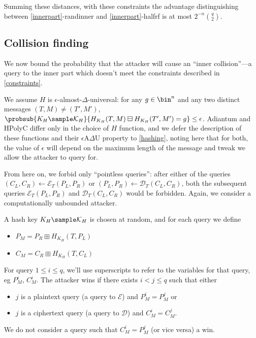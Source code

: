 \documentclass[journal=tosc,preprint,floatrow,submission]{iacrtrans}
\newcommand*{\xprm}[2]{\textsf{\ref*{#1}-#2}}
\newcommand*{\calE}{\mathcal{E}}
\newcommand*{\calD}{\mathcal{D}}
\begin{document}
Summing these distances, with these constraints the advantage distinguishing between
\xprm{innerpart}{randinner} and \xprm{innerpart}{halfrf} is at most
$2^{-n}\binom{q}{2}$.

\subsection{Collision finding}\label{collision}
We now bound the probability that the attacker will cause an
``inner collision''---a query to the inner part which doesn't meet the constraints described
in \autoref{constraints}.

We assume $H$ is $\epsilon$-almost-$\Delta$-universal:
for any $g \in \bin^n$ and
any two distinct messages $(T, M) \neq (T', M')$,
$\probsub{K_H \sample \mathcal{K}_H}{H_{K_H}(T, M) \boxminus H_{K_H}(T', M') = g} \leq \epsilon$.
Adiantum and HPolyC differ only in the choice of $H$ function, and we defer the
description of these functions and their $\epsilon$A$\Delta$U property to \autoref{hashing},
noting here that for both, the value of $\epsilon$ will depend
on the maximum length of the message and tweak we allow the attacker to query for.

From here on, we forbid only ``pointless queries'': after either of the queries
$(C_L, C_R) \leftarrow \calE_T(P_L, P_R)$ or $(P_L, P_R) \leftarrow \calD_T(C_L, C_R)$,
both the subsequent queries
$\calE_T(P_L, P_R)$ and $\calD_T(C_L, C_R)$ would be forbidden. Again, we consider a
computationally unbounded attacker.

A hash key $K_H \sample \mathcal{K}_H$ is chosen at random, and for each query we define
\begin{itemize}
    \item $P_M = P_R \boxplus H_{K_H}(T, P_L)$
    \item $C_M = C_R \boxplus H_{K_H}(T, C_L)$
\end{itemize}

For query $1 \leq i \leq q$, we'll use superscripts to refer to the variables for that query, eg
$P_M^i$, $C_M^i$. The attacker wins if there exists $i < j \leq q$ such that
either
\begin{itemize}
    \item $j$ is a plaintext query (a query to $\calE$) and $P_M^i = P_M^j$ or
    \item $j$ is a ciphertext query (a query to $\calD$) and $C_M^i = C_M^j$.
\end{itemize}
We do not consider a query such that $C_M^i = P_M^j$ (or vice versa) a win.
\end{document}
